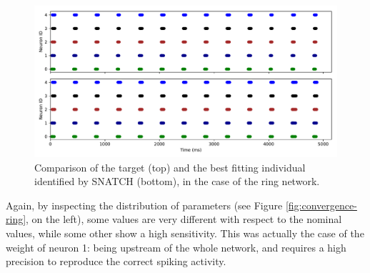 \documentclass[utf8]{frontiersFPHY} %
\newcommand {\name}{SNATCH}
\begin{document}
\begin{figure}[!ht]
	\centering
	\includegraphics[width=\textwidth]{images/ring-network-regular/target_sim.pdf}
	\caption{Comparison of the target (top) and the best fitting individual identified by \name{} (bottom), in the case of the ring network.}
	\label{fig:target-ring}
\end{figure}

Again, by inspecting the distribution of parameters (see Figure \ref{fig:convergence-ring}, on the left), some values are very different with respect to the nominal values, while some other show a high sensitivity. 
This was actually the case of the  weight of neuron 1: being upstream of the whole network, and requires a high precision to reproduce the correct spiking  activity.


\end{document}
